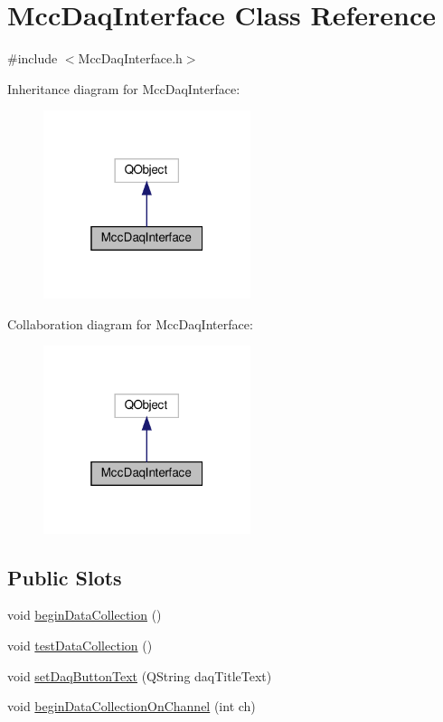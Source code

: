 \hypertarget{class_mcc_daq_interface}{}\section{Mcc\+Daq\+Interface Class Reference}
\label{class_mcc_daq_interface}


{\ttfamily \#include $<$Mcc\+Daq\+Interface.\+h$>$}



Inheritance diagram for Mcc\+Daq\+Interface\+:
\nopagebreak
\begin{figure}[H]
\begin{center}
\leavevmode
\includegraphics[width=172pt]{class_mcc_daq_interface__inherit__graph}
\end{center}
\end{figure}


Collaboration diagram for Mcc\+Daq\+Interface\+:
\nopagebreak
\begin{figure}[H]
\begin{center}
\leavevmode
\includegraphics[width=172pt]{class_mcc_daq_interface__coll__graph}
\end{center}
\end{figure}
\subsection*{Public Slots}
\begin{DoxyCompactItemize}
\item 
void \hyperlink{class_mcc_daq_interface_a5b50adc88a30d405b491cd50926d28ba}{begin\+Data\+Collection} ()
\item 
void \hyperlink{class_mcc_daq_interface_a19b0dfb99a23e5b296554d2a16f773b2}{test\+Data\+Collection} ()
\item 
void \hyperlink{class_mcc_daq_interface_a43bef970ad375bca8b4c5892346629b6}{set\+Daq\+Button\+Text} (Q\+String daq\+Title\+Text)
\item 
void \hyperlink{class_mcc_daq_interface_a45d83d2cf73a5375b7d477e18b672da4}{begin\+Data\+Collection\+On\+Channel} (int ch)
\end{DoxyCompactItemize}
